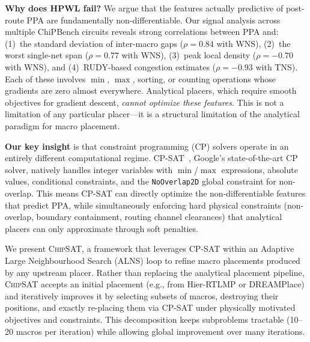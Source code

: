 \documentclass[sigconf,anonymous,review,9pt]{acmart}
\begin{document}
\textbf{Why does HPWL fail?} We argue that the features actually predictive of post-route PPA are fundamentally non-differentiable. Our signal analysis across multiple ChiPBench circuits reveals strong correlations between PPA and: (1)~the standard deviation of inter-macro gaps ($\rho = 0.84$ with WNS), (2)~the worst single-net span ($\rho = 0.77$ with WNS), (3)~peak local density ($\rho = -0.70$ with WNS), and (4)~RUDY-based congestion estimates ($\rho = -0.93$ with TNS). Each of these involves $\min$, $\max$, sorting, or counting operations whose gradients are zero almost everywhere. Analytical placers, which require smooth objectives for gradient descent, \emph{cannot optimize these features}. This is not a limitation of any particular placer---it is a structural limitation of the analytical paradigm for macro placement.

\textbf{Our key insight} is that constraint programming (CP) solvers operate in an entirely different computational regime. CP-SAT~\cite{cpsat2023}, Google's state-of-the-art CP solver, natively handles integer variables with $\min$/$\max$ expressions, absolute values, conditional constraints, and the \texttt{NoOverlap2D} global constraint for non-overlap. This means CP-SAT can directly optimize the non-differentiable features that predict PPA, while simultaneously enforcing hard physical constraints (non-overlap, boundary containment, routing channel clearances) that analytical placers can only approximate through soft penalties.

We present \textsc{ChipSAT}, a framework that leverages CP-SAT within an Adaptive Large Neighbourhood Search (ALNS) loop to refine macro placements produced by any upstream placer. Rather than replacing the analytical placement pipeline, \textsc{ChipSAT} accepts an initial placement (e.g., from Hier-RTLMP or DREAMPlace) and iteratively improves it by selecting subsets of macros, destroying their positions, and exactly re-placing them via CP-SAT under physically motivated objectives and constraints. This decomposition keeps subproblems tractable (10--20 macros per iteration) while allowing global improvement over many iterations.
\end{document}
